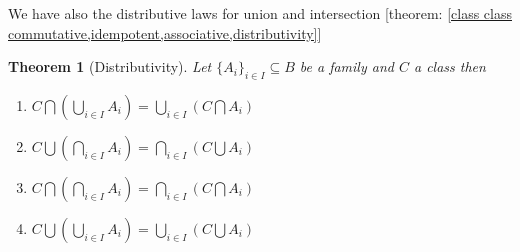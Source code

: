 \documentclass{book}
\newtheorem{theorem}{Theorem}
\begin{document}
We have also the distributive laws for union and intersection [theorem:
\ref{class class commutative,idempotent,associative,distributivity}]

\begin{theorem}[Distributivity]
  \label{family distributivity}Let $\{ A_i \}_{i \in I} \subseteq B$ be a
  family and $C$ a class then
  \begin{enumerate}
    \item $C \bigcap \left( \bigcup_{i \in I} A_i \right) = \bigcup_{i \in I}
    \left( C \bigcap A_i \right)$
    
    \item $C \bigcup \left( \bigcap_{i \in I} A_i \right) = \bigcap_{i \in I}
    \left( C \bigcup A_i \right)$
    
    \item $C \bigcap \left( \bigcap_{i \in I} A_i \right) = \bigcap_{i \in I}
    \left( C \bigcap A_i \right)$
    
    \item $C \bigcup \left( \bigcup_{i \in I} A_i \right) = \bigcup_{i \in I}
    \left( C \bigcup A_i \right)$
  \end{enumerate}
\end{theorem}
\end{document}
